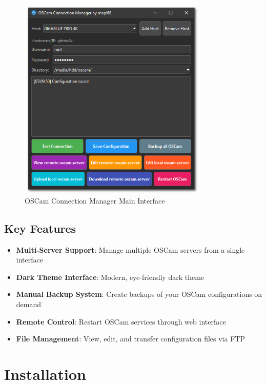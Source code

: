 \documentclass[a4paper,11pt]{report}
\begin{document}
\begin{figure}[!htb]
    \centering
    \includegraphics[width=0.8\textwidth]{screenshot.png}
    \caption{OSCam Connection Manager Main Interface}
    \label{fig:main-interface}
\end{figure}

\section{Key Features}
\begin{itemize}
    \item \textbf{Multi-Server Support}: Manage multiple OSCam servers from a single interface
    \item \textbf{Dark Theme Interface}: Modern, eye-friendly dark theme
    \item \textbf{Manual Backup System}: Create backups of your OSCam configurations on demand
    \item \textbf{Remote Control}: Restart OSCam services through web interface
    \item \textbf{File Management}: View, edit, and transfer configuration files via FTP
\end{itemize}

\chapter{Installation}
\end{document}
